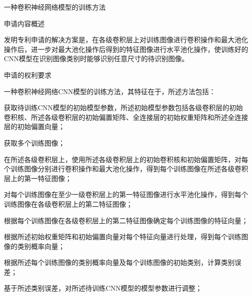{\setlength{\parindent}{15.3bp}\par}

{\setlength{\parindent}{20.6bp}一种卷积神经网络模型的训练方法\par}

{\setlength{\parindent}{20.1bp}申请内容概述\par}

{\setlength{\parindent}{20.6bp}发明专利申请的解决方案是，在各级卷积层上对训练图像进行卷积操作和最大池化操作后，进一步对最大池化操作后得到的特征图像进行水平池化操作，使训练好的CNN模型在识别图像类别时能够识别任意尺寸的待识别图像。\par}

{\setlength{\parindent}{20.1bp}申请的权利要求\par}

{\setlength{\parindent}{20.6bp}一种卷积神经网络CNN模型的训练方法，其特征在于，所述方法包括：\par}

{\setlength{\parindent}{20.6bp}获取待训练CNN模型的初始模型参数，所述初始模型参数包括各级卷积层的初始卷积核、所述各级卷积层的初始偏置矩阵、全连接层的初始权重矩阵和所述全连接层的初始偏置向量；\par}

{\setlength{\parindent}{20.6bp}获取多个训练图像；\par}

{\setlength{\parindent}{20.6bp}在所述各级卷积层上，使用所述各级卷积层上的初始卷积核和初始偏置矩阵，对每个训练图像分别进行卷积操作和最大池化操作，得到每个训练图像在所述各级卷积层上的第一特征图像；\par}

{\setlength{\parindent}{20.6bp}对每个训练图像在至少一级卷积层上的第一特征图像进行水平池化操作，得到每个训练图像在各级卷积层上的第二特征图像；\par}

{\setlength{\parindent}{20.6bp}根据每个训练图像在各级卷积层上的第二特征图像确定每个训练图像的特征向量；\par}

{\setlength{\parindent}{20.6bp}根据所述初始权重矩阵和初始偏置向量对每个特征向量进行处理，得到每个训练图像的类别概率向量；\par}

{\setlength{\parindent}{20.6bp}根据所述每个训练图像的类别概率向量及每个训练图像的初始类别，计算类别误差；\par}

{\setlength{\parindent}{20.6bp}基于所述类别误差，对所述待训练CNN模型的模型参数进行调整；\par}

